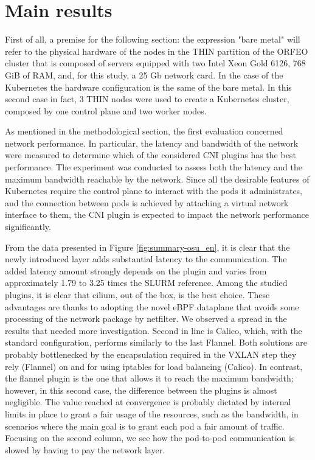 \section*{Main results}

First of all, a premise for the following section: the expression "bare metal"
will refer to the physical hardware of the nodes in the THIN partition of the
ORFEO cluster that is composed of servers equipped with two Intel Xeon Gold
6126, 768 GiB of RAM, and, for this study, a 25 Gb network card.
In the case of the Kubernetes the hardware configuration is the same of the bare
metal. In this second case in fact, 3 THIN nodes were used to create a
Kubernetes cluster, composed by one control plane and two worker nodes.

As mentioned in the methodological section, the first evaluation concerned
network performance. In particular, the latency and bandwidth of the network
were measured to determine which of the considered CNI plugins has the best
performance. The experiment was conducted to assess both the latency and the
maximum bandwidth reachable by the network. Since all the desirable features of
Kubernetes require the control plane to interact with the pods it administrates,
and the connection between pods is achieved by attaching a virtual network
interface to them, the CNI plugin is expected to impact the network performance
significantly.

From the data presented in Figure \ref{fig:summary-osu_en}, it is clear that the
newly introduced layer adds substantial latency to the communication. The added
latency amount strongly depends on the plugin and varies from approximately 1.79
to 3.25 times the SLURM reference. Among the studied plugins, it is clear that
cilium, out of the box, is the best choice. These advantages are thanks to
adopting the novel eBPF dataplane that avoids some processing of the network
package by netfilter. We observed a spread in the results that needed more
investigation. Second in line is Calico, which, with the standard configuration,
performs similarly to the last Flannel.
Both solutions are probably bottlenecked by the encapsulation required in the
VXLAN step they rely (Flannel) on and for using iptables for load balancing
(Calico).
In contrast, the flannel plugin is the one that allows it to reach the maximum
bandwidth; however, in this second case, the difference between the plugins is
almost negligible. The value reached at convergence is probably dictated by
internal limits in place to grant a fair usage of the resources, such as the
bandwidth, in scenarios where the main goal is to grant each pod a fair amount
of traffic. Focusing on the second column, we see how the pod-to-pod
communication is slowed by having to pay the network layer.


